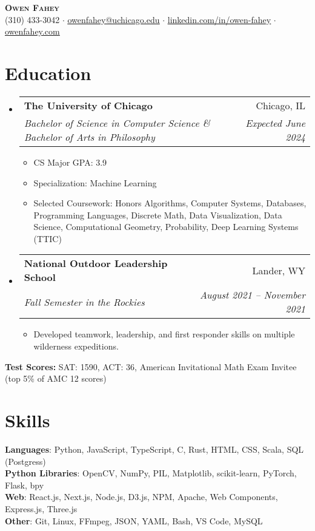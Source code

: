 \documentclass[letterpaper,11pt]{article}
\makeatletter
\newcommand{\resumeItem}[1]{
  \item\small{
    {#1 \vspace{-2pt}}
  }
}
\newcommand{\resumeSubheading}[4]{
  \vspace{-2pt}\item
    \begin{tabular*}{0.97\textwidth}[t]{l@{\extracolsep{\fill}}r}
      \textbf{#1} & #2 \\
      \textit{\small#3} & \textit{\small #4} \\
    \end{tabular*}\vspace{-7pt}
}
\newcommand{\resumeSubHeadingListStart}{\begin{itemize}[leftmargin=0.15in, label={}]}
\newcommand{\resumeSubHeadingListEnd}{\end{itemize}}
\newcommand{\resumeItemListStart}{\begin{itemize}}
\newcommand{\resumeItemListEnd}{\end{itemize}\vspace{-5pt}}
\makeatother
\begin{document}
\begin{center}
  \textbf{\Huge \scshape Owen Fahey} \\
  \small (310) 433-3042 $\cdot$
  \href{mailto:owenfahey@uchicago.edu}{\underline{owenfahey@uchicago.edu}} $\cdot$
  \href{https://www.linkedin.com/in/owen-fahey}{\underline{linkedin.com/in/owen-fahey}} $\cdot$
  \href{https://owenfahey.com}{\underline{owenfahey.com}}
\end{center}

\section{Education}
  \resumeSubHeadingListStart
    \resumeSubheading
      {The University of Chicago}{Chicago, IL}
      {Bachelor of Science in Computer Science \& Bachelor of Arts in Philosophy}{Expected June 2024}
      \resumeItemListStart
        \resumeItem{CS Major GPA: 3.9}
        \resumeItem {Specialization: Machine Learning}
        \resumeItem{{Selected Coursework:} Honors Algorithms, Computer Systems, Databases, Programming Languages, Discrete Math, Data Visualization, Data Science, Computational Geometry, Probability, Deep Learning Systems (TTIC)}
      \resumeItemListEnd
    \resumeSubheading
      {National Outdoor Leadership School}{Lander, WY}
      {Fall Semester in the Rockies}{August 2021 -- November 2021}
      \resumeItemListStart
        \resumeItem{Developed teamwork, leadership, and first responder skills on multiple wilderness expeditions.}
      \resumeItemListEnd
  \resumeSubHeadingListEnd

  {
    \vspace{-5pt}
    \noindent\hspace{0.15in}\small\textbf{Test Scores:} SAT: 1590, ACT: 36, American Invitational Math Exam Invitee (top 5\% of AMC 12 scores)
    }

\section{Skills}
  \begin{itemize}[leftmargin=0.15in, label={}]
    \small{\item{
      \textbf{Languages}{: Python, JavaScript, TypeScript, C, Rust, HTML, CSS, Scala, SQL (Postgress)} \\
      \textbf{Python Libraries}{: OpenCV, NumPy, PIL, Matplotlib, scikit-learn, PyTorch, Flask, bpy} \\
      \textbf{Web}{: React.js, Next.js, Node.js, D3.js, NPM, Apache, Web Components, Express.js, Three.js} \\
      \textbf{Other}{: Git, Linux, FFmpeg, JSON, YAML, Bash, VS Code, MySQL}
    }}
  \end{itemize}
\end{document}
